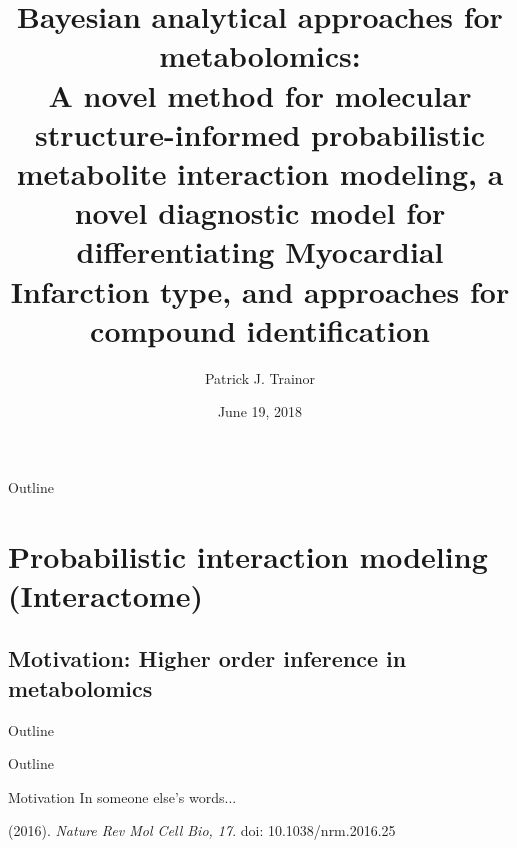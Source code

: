 \documentclass[xcolor=dvipsnames]{beamer}
\begin{document}
	
\title[Bayesian Methods for Metabolomics]{{\bf Bayesian analytical approaches for metabolomics:}\\ {\small A novel method for molecular structure-informed probabilistic metabolite interaction modeling, a novel diagnostic model for differentiating Myocardial Infarction type, and approaches for compound identification}}
\author[P.J. Trainor]{Patrick J. Trainor}
\date[July 2018]{June 19, 2018}

\begin{frame}
	\titlepage
\end{frame}

\begin{frame}{Outline}
	\vspace{-10.5pt}
	\tableofcontents[hideallsubsections]
\end{frame}

\section{Probabilistic interaction modeling (Interactome)}
\subsection{Motivation: Higher order inference in metabolomics}
\begin{frame}{Outline}
	\vspace{-10.5pt}
	\tableofcontents[currentsection,subsectionstyle=hide]
\end{frame}

\begin{frame}{Outline}
	\vspace{-10.5pt}
	\tableofcontents[currentsection,subsectionstyle=show/shaded/hide]
\end{frame}

\begin{frame}{Motivation}
	\vspace{-15.5pt}
	{\LARGE In someone else's words...}
	\begin{center}
	\end{center}
	(2016). \emph{Nature Rev Mol Cell Bio, 17}. doi: 10.1038/nrm.2016.25
\end{frame}
\end{document}

